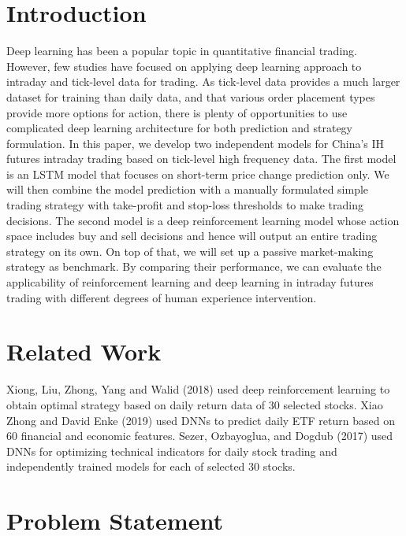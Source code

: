 \documentclass{article}
\begin{document}
\section{Introduction}
\label{intro}

Deep learning has been a popular topic in quantitative financial trading. However, few studies have focused on applying deep learning approach to intraday and tick-level data for trading. As tick-level data provides a much larger dataset for training than daily data, and that various order placement types provide more options for action, there is plenty of opportunities to use complicated deep learning architecture for both prediction and strategy formulation. In this paper, we develop two independent models for China’s IH futures intraday trading based on tick-level high frequency data. The first model is an LSTM model that focuses on short-term price change prediction only. We will then combine the model prediction with a manually formulated simple trading strategy with take-profit and stop-loss thresholds to make trading decisions. The second model is a deep reinforcement learning model whose action space includes buy and sell decisions and hence will output an entire trading strategy on its own. On top of that, we will set up a passive market-making strategy as benchmark. By comparing their performance, we can evaluate the applicability of reinforcement learning and deep learning in intraday futures trading with different degrees of human experience intervention.

\section{Related Work}

Xiong, Liu, Zhong, Yang and Walid (2018) used deep reinforcement learning to obtain optimal strategy based on daily return data of 30 selected stocks\cite{xiong2018practical}. Xiao Zhong and David Enke (2019) used DNNs to predict daily ETF return based on 60 financial and economic features. Sezer, Ozbayoglua, and Dogdub (2017) used DNNs for optimizing technical indicators for daily stock trading and independently trained models for each of selected 30 stocks\cite{SEZER2017473}.

\section{Problem Statement}
\end{document}
